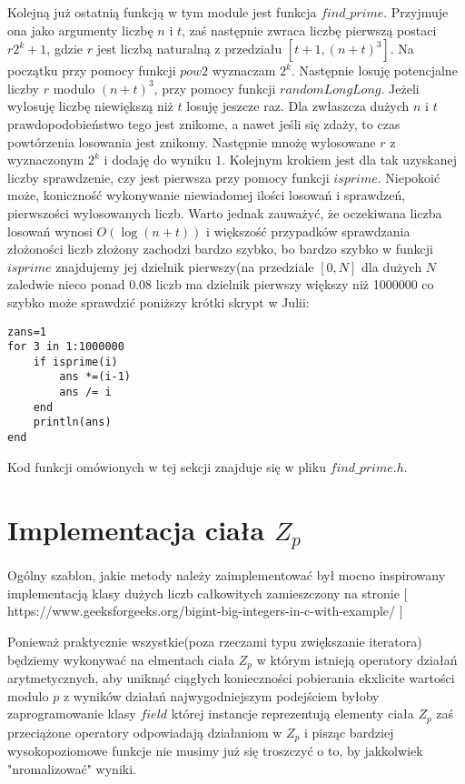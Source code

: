 \documentclass{article}
\begin{document}
Kolejną już ostatnią funkcją w tym module jest funkcja $find\_prime$. Przyjmuje ona jako argumenty liczbę $n$ i $t$, zaś następnie zwraca liczbę pierwszą postaci $r2^k+1$, gdzie $r$ jest liczbą naturalną z przedziału $[t+1,(n+t)^3]$. Na początku przy pomocy funkcji $pow2$ wyznaczam $2^k$. Następnie losuję potencjalne liczby $r$ modulo $(n+t)^3$, przy pomocy
funkcji $randomLongLong$. Jeżeli wylosuję liczbę niewiększą niż $t$ losuję jeszcze raz. Dla zwłaszcza dużych $n$ i $t$
prawdopodobieństwo tego jest znikome, a nawet jeśli się zdaży, to czas powtórzenia losowania jest znikomy. Następnie mnożę
wylosowane $r$ z wyznaczonym $2^k$ i dodaję do wyniku $1$. Kolejnym krokiem jest dla tak uzyskanej liczby sprawdzenie, czy 
jest pierwsza przy pomocy funkcji $isprime$. Niepokoić może, koniczność wykonywanie niewiadomej ilości losowań i sprawdzeń, pierwszości wylosowanych liczb. Warto jednak zauważyć, że oczekiwana liczba losowań wynosi $O(\log(n+t))$ i większość przypadków sprawdzania złożoności liczb złożony zachodzi bardzo szybko, bo bardzo szybko w funkcji $isprime$ znajdujemy jej dzielnik pierwszy(na przedziale $[0,N]$ dla dużych $N$ zaledwie nieco ponad $0.08$ liczb ma dzielnik pierwszy większy niż 1000000 co szybko może sprawdzić poniższy krótki skrypt w Julii:
\begin{lstlisting}
zans=1
for 3 in 1:1000000
    if isprime(i)
        ans *=(i-1)
        ans /= i
    end 
    println(ans)
end
\end{lstlisting}
Kod funkcji omówionych w tej sekcji znajduje się w pliku $find\_prime.h$.

\section{Implementacja ciała $Z_p$}

Ogólny szablon, jakie metody należy zaimplementować był 
mocno inspirowany implementacją klasy dużych liczb całkowitych
zamieszczony na stronie [ https://www.geeksforgeeks.org/bigint-big-integers-in-c-with-example/ ]


Ponieważ praktycznie wszystkie(poza rzeczami typu zwiększanie iteratora) będziemy wykonywać na elmentach ciała
$Z_p$ w którym istnieją operatory działań arytmetycznych, aby uniknąć ciągłych konieczności pobierania ekxlicite
wartości modulo $p$ z wyników działań najwygodniejszym podejściem byłoby zaprogramowanie klasy $field$ której instancje
reprezentują elementy ciała $Z_p$ zaś przeciążone operatory odpowiadają działaniom w $Z_p$ i pisząc bardziej 
wysokopoziomowe funkcje nie musimy już się troszczyć o to, by jakkolwiek "nromalizować" wyniki. 
\end{document}
